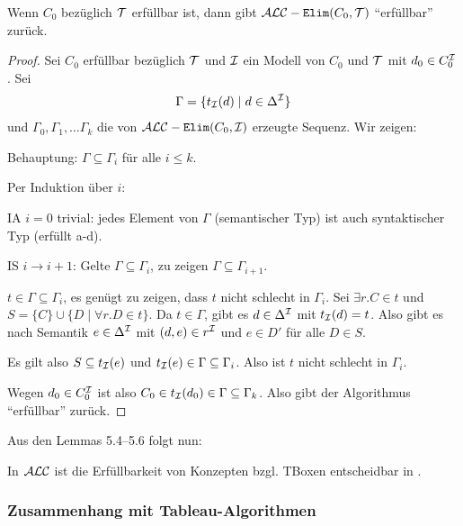 \begin{lemma}
    Wenn $C_0$ bezüglich $\mathcal{T}$ erfüllbar ist, dann gibt $\mathcal{A}\mathcal{L}\mathcal{C}-\texttt{Elim}(C_0, \mathcal{T})$ \enquote{erfüllbar} zurück.
\end{lemma}

\begin{proof}
    Sei $C_0$ erfüllbar bezüglich $\mathcal{T}$ und $\mathcal{I}$ ein Modell von $C_0$ und $\mathcal{T}$ mit $d_0 \in C_0^{\mathcal{I}}$. Sei
    \begin{align*}
        \Gamma = \{ t_{\mathcal{I}}(d) \mid d \in \Delta^{\mathcal{I}}\}
    \end{align*}
    und $\Gamma_0, \Gamma_1, \ldots \Gamma_k$ die von $\mathcal{A}\mathcal{L}\mathcal{C}-\texttt{Elim}(C_0, \mathcal{I})$ erzeugte Sequenz.
    Wir zeigen:

    Behauptung: $\Gamma \subseteq \Gamma_i$ für alle $i \leq k$.
    \begin{tafel}
    Per Induktion über $i$:

    IA $i = 0$ trivial: jedes Element von $\Gamma$ (semantischer Typ) ist auch syntaktischer Typ (erfüllt a-d).

    IS $i \rightarrow i + 1$: Gelte $\Gamma \subseteq \Gamma_i$, zu zeigen $\Gamma \subseteq \Gamma_{i + 1}$.

    $t \in \Gamma \subseteq \Gamma_i$, es genügt zu zeigen, dass $t$ nicht schlecht in $\Gamma_i$. Sei $\exists r.C \in t$ und $S = \{C\} \cup \{D\mid \forall r.D \in t\}$. Da $t \in \Gamma$, gibt es $d \in \Delta^{\mathcal{I}}$ mit $t_{\mathcal{I}}(d) = t$. Also gibt es nach Semantik $e \in \Delta^{\mathcal{I}}$ mit $(d, e) \in r^{\mathcal{I}}$ und $e \in D'$ für alle $D \in S$.

    Es gilt also $S \subseteq t_{\mathcal{I}}(e)$ und $t_{\mathcal{I}}(e) \in \Gamma \subseteq \Gamma_i$. Also ist $t$ nicht schlecht in $\Gamma_i$.
    \end{tafel}
    Wegen $d_0 \in C_0^{\mathcal{I}}$ ist also $C_0 \in t_{\mathcal{I}}(d_0) \in \Gamma \subseteq \Gamma_k$. Also gibt der Algorithmus \enquote{erfüllbar} zurück.
\end{proof}


Aus den Lemmas 5.4--5.6 folgt nun:

\begin{theorem}\label{thm:tbox-exptime}
In $\mathcal{A}\mathcal{L}\mathcal{C}$ ist die Erfüllbarkeit von Konzepten bzgl. TBoxen entscheidbar in \ExpTime.
\end{theorem}

\subsubsection{Zusammenhang mit Tableau-Algorithmen}

